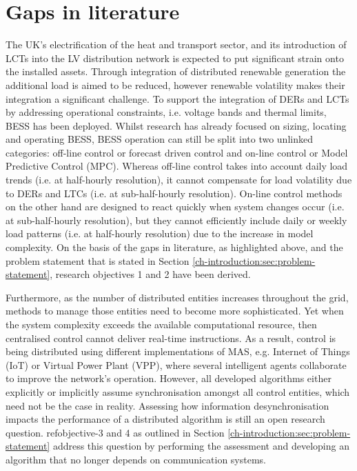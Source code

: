 \section{Gaps in literature}
\label{ch-literature:sec:literature-gaps}

The UK's electrification of the heat and transport sector, and its introduction of LCTs into the LV distribution network is expected to put significant strain onto the installed assets.
Through integration of distributed renewable generation the additional load is aimed to be reduced, however renewable volatility makes their integration a significant challenge.
To support the integration of DERs and LCTs by addressing operational constraints, i.e. voltage bands and thermal limits, BESS has been deployed.
Whilst research has already focused on sizing, locating and operating BESS, BESS operation can still be split into two unlinked categories: off-line control or forecast driven control and on-line control or Model Predictive Control (MPC).
Whereas off-line control takes into account daily load trends (i.e. at half-hourly resolution), it cannot compensate for load volatility due to DERs and LTCs (i.e. at sub-half-hourly resolution).
On-line control methods on the other hand are designed to react quickly when system changes occur (i.e. at sub-half-hourly resolution), but they cannot efficiently include daily or weekly load patterns (i.e. at half-hourly resolution) due to the increase in model complexity.
On the basis of the gaps in literature, as highlighted above, and the problem statement that is stated in Section \ref{ch-introduction:sec:problem-statement}, research objectives 1 and 2 have been derived.

Furthermore, as the number of distributed entities increases throughout the grid, methods to manage those entities need to become more sophisticated.
Yet when the system complexity exceeds the available computational resource, then centralised control cannot deliver real-time instructions.
As a result, control is being distributed using different implementations of MAS, e.g. Internet of Things (IoT) or Virtual Power Plant (VPP), where several intelligent agents collaborate to improve the network's operation.
However, all developed algorithms either explicitly or implicitly assume synchronisation amongst all control entities, which need not be the case in reality.
Assessing how information desynchronisation impacts the performance of a distributed algorithm is still an open research question.
ref{objective-3} and 4 as outlined in Section \ref{ch-introduction:sec:problem-statement} address this question by performing the assessment and developing an algorithm that no longer depends on communication systems.

